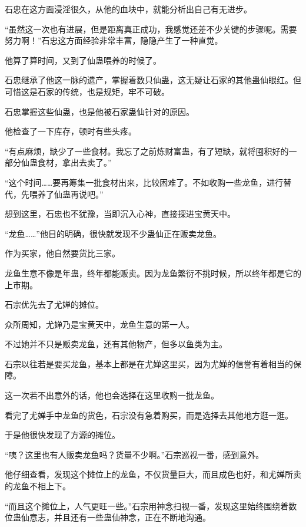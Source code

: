 
\begin{this_body}

石忠在这方面浸淫很久，从他的血块中，就能分析出自己有无进步。

“虽然这一次也有进展，但是距离真正成功，我感觉还差不少关键的步骤呢。需要努力啊！”石忠这方面经验非常丰富，隐隐产生了一种直觉。

他算了算时间，又到了仙蛊喂养的时候了。

石忠继承了他这一脉的遗产，掌握着数只仙蛊，这无疑让石家的其他蛊仙眼红。但可惜这是石家的传统，也是规矩，牢不可破。

石忠掌握这些仙蛊，也是他被石家蛊仙针对的原因。

他检查了一下库存，顿时有些头疼。

“有点麻烦，缺少了一些食材。我忘了之前炼财富蛊，有了短缺，就将囤积好的一部分仙蛊食材，拿出去卖了。”

“这个时间……要再筹集一批食材出来，比较困难了。不如收购一些龙鱼，进行替代，先喂养了仙蛊再说吧。”

想到这里，石忠也不犹豫，当即沉入心神，直接探进宝黄天中。

“龙鱼……”他目的明确，很快就发现不少蛊仙正在贩卖龙鱼。

作为买家，他自然要货比三家。

龙鱼生意不像是年蛊，终年都能贩卖。因为龙鱼繁衍不挑时候，所以终年都是它的上市期。

石宗优先去了尤婵的摊位。

众所周知，尤婵乃是宝黄天中，龙鱼生意的第一人。

不过她并不只是贩卖龙鱼，还有其他物产，但多以鱼类为主。

石宗以往若是要买龙鱼，基本上都是在尤婵这里买，因为尤婵的信誉有着相当的保障。

这一次若不出意外的话，他也会选择在这里收购一批龙鱼。

看完了尤婵手中龙鱼的货色，石宗没有急着购买，而是选择去其他地方逛一逛。

于是他很快发现了方源的摊位。

“咦？这里也有人贩卖龙鱼吗？货量不少啊。”石宗巡视一番，感到意外。

他仔细查看，发现这个摊位上的龙鱼，不仅货量巨大，而且成色也好，和尤婵所卖的龙鱼不相上下。

“而且这个摊位上，人气更旺一些。”石宗用神念扫视一番，发现这里始终围绕着数位蛊仙意志，并且还有一些蛊仙神念，正在不断地沟通。


\end{this_body}
